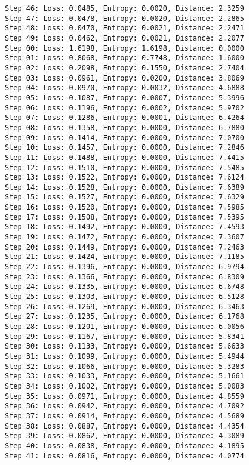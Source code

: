 \documentclass[11pt]{article}
\begin{document}
\begin{Verbatim}[commandchars=\\\{\}]
Step 46: Loss: 0.0485, Entropy: 0.0020, Distance: 2.3259
Step 47: Loss: 0.0478, Entropy: 0.0020, Distance: 2.2865
Step 48: Loss: 0.0470, Entropy: 0.0021, Distance: 2.2471
Step 49: Loss: 0.0462, Entropy: 0.0021, Distance: 2.2077
Step 00: Loss: 1.6198, Entropy: 1.6198, Distance: 0.0000
Step 01: Loss: 0.8068, Entropy: 0.7748, Distance: 1.6000
Step 02: Loss: 0.2098, Entropy: 0.1550, Distance: 2.7404
Step 03: Loss: 0.0961, Entropy: 0.0200, Distance: 3.8069
Step 04: Loss: 0.0970, Entropy: 0.0032, Distance: 4.6888
Step 05: Loss: 0.1087, Entropy: 0.0007, Distance: 5.3996
Step 06: Loss: 0.1196, Entropy: 0.0002, Distance: 5.9702
Step 07: Loss: 0.1286, Entropy: 0.0001, Distance: 6.4264
Step 08: Loss: 0.1358, Entropy: 0.0000, Distance: 6.7880
Step 09: Loss: 0.1414, Entropy: 0.0000, Distance: 7.0700
Step 10: Loss: 0.1457, Entropy: 0.0000, Distance: 7.2846
Step 11: Loss: 0.1488, Entropy: 0.0000, Distance: 7.4415
Step 12: Loss: 0.1510, Entropy: 0.0000, Distance: 7.5485
Step 13: Loss: 0.1522, Entropy: 0.0000, Distance: 7.6124
Step 14: Loss: 0.1528, Entropy: 0.0000, Distance: 7.6389
Step 15: Loss: 0.1527, Entropy: 0.0000, Distance: 7.6329
Step 16: Loss: 0.1520, Entropy: 0.0000, Distance: 7.5985
Step 17: Loss: 0.1508, Entropy: 0.0000, Distance: 7.5395
Step 18: Loss: 0.1492, Entropy: 0.0000, Distance: 7.4593
Step 19: Loss: 0.1472, Entropy: 0.0000, Distance: 7.3607
Step 20: Loss: 0.1449, Entropy: 0.0000, Distance: 7.2463
Step 21: Loss: 0.1424, Entropy: 0.0000, Distance: 7.1185
Step 22: Loss: 0.1396, Entropy: 0.0000, Distance: 6.9794
Step 23: Loss: 0.1366, Entropy: 0.0000, Distance: 6.8309
Step 24: Loss: 0.1335, Entropy: 0.0000, Distance: 6.6748
Step 25: Loss: 0.1303, Entropy: 0.0000, Distance: 6.5128
Step 26: Loss: 0.1269, Entropy: 0.0000, Distance: 6.3463
Step 27: Loss: 0.1235, Entropy: 0.0000, Distance: 6.1768
Step 28: Loss: 0.1201, Entropy: 0.0000, Distance: 6.0056
Step 29: Loss: 0.1167, Entropy: 0.0000, Distance: 5.8341
Step 30: Loss: 0.1133, Entropy: 0.0000, Distance: 5.6633
Step 31: Loss: 0.1099, Entropy: 0.0000, Distance: 5.4944
Step 32: Loss: 0.1066, Entropy: 0.0000, Distance: 5.3283
Step 33: Loss: 0.1033, Entropy: 0.0000, Distance: 5.1661
Step 34: Loss: 0.1002, Entropy: 0.0000, Distance: 5.0083
Step 35: Loss: 0.0971, Entropy: 0.0000, Distance: 4.8559
Step 36: Loss: 0.0942, Entropy: 0.0000, Distance: 4.7092
Step 37: Loss: 0.0914, Entropy: 0.0000, Distance: 4.5689
Step 38: Loss: 0.0887, Entropy: 0.0000, Distance: 4.4354
Step 39: Loss: 0.0862, Entropy: 0.0000, Distance: 4.3089
Step 40: Loss: 0.0838, Entropy: 0.0000, Distance: 4.1895
Step 41: Loss: 0.0816, Entropy: 0.0000, Distance: 4.0774

\end{Verbatim}
\end{document}
